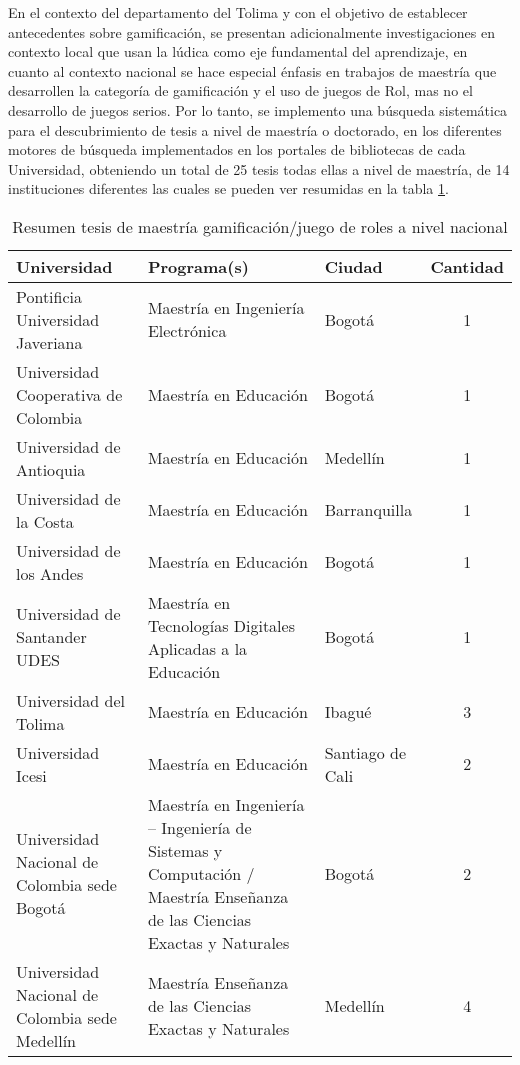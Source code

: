 En el contexto del departamento del Tolima y con el objetivo de establecer antecedentes sobre gamificación, se 
presentan adicionalmente investigaciones en contexto local que usan la lúdica como eje fundamental del 
aprendizaje, en cuanto al contexto nacional se hace especial énfasis en trabajos de maestría que desarrollen 
la categoría de gamificación y el uso de juegos de Rol, mas no el desarrollo de juegos serios. Por lo tanto,
se implemento una búsqueda sistemática para el descubrimiento de tesis a nivel de maestría o doctorado, en los
diferentes motores de búsqueda implementados en los portales de bibliotecas de cada Universidad, obteniendo un 
total de 25 tesis todas ellas a nivel de maestría, de 14 instituciones diferentes las cuales se pueden ver 
resumidas en la tabla \ref{tab:resumenlocal}.

\begin{table}[!htb]
\caption{Resumen tesis de maestría gamificación/juego de roles a nivel nacional}
\label{tab:resumenlocal}
\begin{center}
\footnotesize
\begin{tabular}{ p{50mm} p{50mm} p{15mm} c}
\toprule
	\textbf{Universidad} & \textbf{Programa(s)} & \textbf{Ciudad} & \textbf{Cantidad}\\ 
\midrule
	Pontificia Universidad Javeriana & Maestría en Ingeniería Electrónica & Bogotá & 1\\
	Universidad Cooperativa de Colombia & Maestría en Educación & Bogotá & 1\\
	Universidad de Antioquia & Maestría en Educación & Medellín & 1\\
	Universidad de la Costa & Maestría en Educación & Barranquilla & 1\\
	Universidad de los Andes & Maestría en Educación & Bogotá & 1\\
	Universidad de Santander UDES & Maestría en Tecnologías Digitales Aplicadas a la Educación & Bogotá & 
	1\\ 
	Universidad del Tolima & Maestría en Educación & Ibagué & 3\\
	Universidad Icesi & Maestría en Educación & Santiago de Cali & 2\\
	Universidad Nacional de Colombia sede Bogotá & Maestría en Ingeniería – Ingeniería de Sistemas y 
		Computación / Maestría Enseñanza de las Ciencias Exactas y Naturales & Bogotá & 2\\
	Universidad Nacional de Colombia sede Medellín & Maestría Enseñanza de las Ciencias Exactas y 
		Naturales & Medellín & 4\\

\end{tabular}
\end{center}
\end{table}

